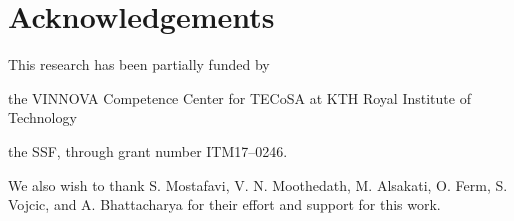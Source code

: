 \section*{Acknowledgements}\label{sec:acks}

This research has been partially funded by
\begin{enumerate*}[itemjoin={{; }}, itemjoin*={{; and }}]
    \item the VINNOVA Competence Center for \ac{TECoSA} at KTH Royal Institute of Technology
    \item the \ac{SSF}, through grant number ITM17--0246.
\end{enumerate*}

We also wish to thank S. Mostafavi, V. N. Moothedath, M. Alsakati, O. Ferm, S. Vojcic, and A. Bhattacharya for their effort and support for this work.
